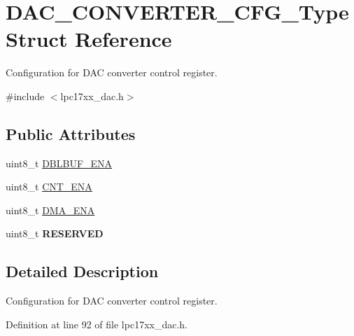 \hypertarget{struct_d_a_c___c_o_n_v_e_r_t_e_r___c_f_g___type}{\section{\-D\-A\-C\-\_\-\-C\-O\-N\-V\-E\-R\-T\-E\-R\-\_\-\-C\-F\-G\-\_\-\-Type \-Struct \-Reference}
\label{struct_d_a_c___c_o_n_v_e_r_t_e_r___c_f_g___type}
}


\-Configuration for \-D\-A\-C converter control register.  




{\ttfamily \#include $<$lpc17xx\-\_\-dac.\-h$>$}

\subsection*{\-Public \-Attributes}
\begin{DoxyCompactItemize}
\item 
uint8\-\_\-t \hyperlink{struct_d_a_c___c_o_n_v_e_r_t_e_r___c_f_g___type_ac6181d741003e4984192878dadb98abc}{\-D\-B\-L\-B\-U\-F\-\_\-\-E\-N\-A}
\item 
uint8\-\_\-t \hyperlink{struct_d_a_c___c_o_n_v_e_r_t_e_r___c_f_g___type_aa725a7b430c776db0fe786be0acb3fff}{\-C\-N\-T\-\_\-\-E\-N\-A}
\item 
uint8\-\_\-t \hyperlink{struct_d_a_c___c_o_n_v_e_r_t_e_r___c_f_g___type_ab7d2da673bb34b9d2ca7e55535bb7304}{\-D\-M\-A\-\_\-\-E\-N\-A}
\item 
\hypertarget{struct_d_a_c___c_o_n_v_e_r_t_e_r___c_f_g___type_a08ebb3f3bdededb6df264a7d227c4e20}{uint8\-\_\-t {\bfseries \-R\-E\-S\-E\-R\-V\-E\-D}}\label{struct_d_a_c___c_o_n_v_e_r_t_e_r___c_f_g___type_a08ebb3f3bdededb6df264a7d227c4e20}

\end{DoxyCompactItemize}


\subsection{\-Detailed \-Description}
\-Configuration for \-D\-A\-C converter control register. 

\-Definition at line 92 of file lpc17xx\-\_\-dac.\-h.



